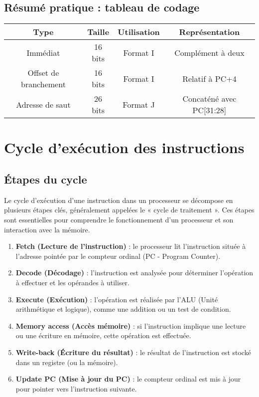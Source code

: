 \documentclass[12pt,a4paper]{article}
\begin{document}
\subsection{Résumé pratique : tableau de codage}
\begin{center}
\begin{tabular}{|c|c|c|c|}
\hline
\textbf{Type} & \textbf{Taille} & \textbf{Utilisation} & \textbf{Représentation} \\
\hline
Immédiat & 16 bits & Format I & Complément à deux \\
Offset de branchement & 16 bits & Format I & Relatif à PC+4 \\
Adresse de saut & 26 bits & Format J & Concaténé avec PC[31:28] \\
\hline
\end{tabular}
\end{center}

\newpage

\section{Cycle d'exécution des instructions}

\subsection{Étapes du cycle}
Le cycle d'exécution d'une instruction dans un processeur se décompose en plusieurs étapes clés, généralement appelées le « cycle de traitement ». Ces étapes sont essentielles pour comprendre le fonctionnement d'un processeur et son interaction avec la mémoire.

\begin{enumerate}
  \item \textbf{Fetch (Lecture de l'instruction)} : le processeur lit l'instruction située à l'adresse pointée par le compteur ordinal (PC - Program Counter).
  \item \textbf{Decode (Décodage)} : l'instruction est analysée pour déterminer l'opération à effectuer et les opérandes à utiliser.
  \item \textbf{Execute (Exécution)} : l'opération est réalisée par l'ALU (Unité arithmétique et logique), comme une addition ou un test de condition.
  \item \textbf{Memory access (Accès mémoire)} : si l'instruction implique une lecture ou une écriture en mémoire, cette opération est effectuée.
  \item \textbf{Write-back (Écriture du résultat)} : le résultat de l'instruction est stocké dans un registre (ou la mémoire).
  \item \textbf{Update PC (Mise à jour du PC)} : le compteur ordinal est mis à jour pour pointer vers l'instruction suivante.
\end{enumerate}
\end{document}
